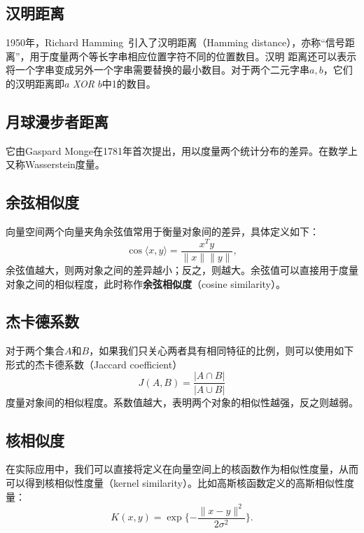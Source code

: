\subsection{汉明距离}
1950年，Richard Hamming~\cite{hamming1950error}引入了汉明距离（Hamming distance），亦称“信号距离”，用于度量两个等长字串相应位置字符不同的位置数目。汉明 距离还可以表示将一个字串变成另外一个字串需要替换的最小数目。对于两个二元字串$a,b$，它们的汉明距离即$a$ \textit{XOR} $b$中1的数目。

\subsection{月球漫步者距离}
它由Gaspard Monge在1781年首次提出，用以度量两个统计分布的差异。在数学上又称Wasserstein度量。

\subsection{余弦相似度}
向量空间两个向量夹角余弦值常用于衡量对象间的差异，具体定义如下：
\begin{equation}\label{eq:cosinesim}
    \cos\langle x,y\rangle=\frac{x^T y}{\|x\|\|y\|},
\end{equation}
余弦值越大，则两对象之间的差异越小；反之，则越大。余弦值可以直接用于度量对象之间的相似程度，此时称作\textbf{余弦相似度}（cosine similarity）。

\subsection{杰卡德系数}
对于两个集合$A$和$B$，如果我们只关心两者具有相同特征的比例，则可以使用如下形式的杰卡德系数（Jaccard coefficient）
\begin{equation}\label{eq:jaccard}
    J(A,B)=\frac{|A\cap B|}{|A\cup B|}
\end{equation}
度量对象间的相似程度。系数值越大，表明两个对象的相似性越强，反之则越弱。

\subsection{核相似度}
在实际应用中，我们可以直接将定义在向量空间上的核函数作为相似性度量，从而可以得到核相似性度量（kernel similarity）。比如高斯核函数定义的高斯相似性度量：
\begin{equation}\label{eq:kernelsim}
    K(x,y)=\exp\{-\frac{\|x-y\|^2}{2\sigma^2}\}.
\end{equation}

